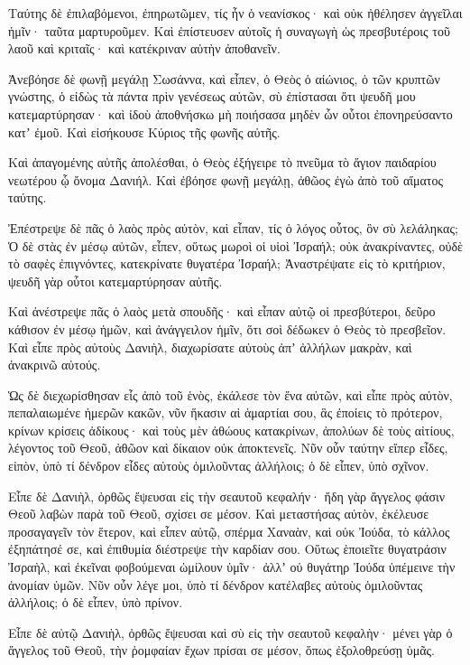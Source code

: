 {Ταύτης δὲ ἐπιλαβόμενοι, ἐπηρωτῶμεν, τίς ἦν ὁ νεανίσκος· καὶ οὐκ ἠθέλησεν ἀγγεῖλαι ἡμῖν· ταῦτα μαρτυροῦμεν.
Καὶ ἐπίστευσεν αὐτοῖς ἡ συναγωγὴ ὡς πρεσβυτέροις τοῦ λαοῦ καὶ κριταῖς· καὶ κατέκριναν αὐτὴν ἀποθανεῖν.
\par }{\PP {}Ἀνεβόησε δὲ φωνῇ μεγάλῃ Σωσάννα, καὶ εἶπεν, ὁ Θεὸς ὁ αἰώνιος, ὁ τῶν κρυπτῶν γνώστης, ὁ εἰδὼς τὰ πάντα πρὶν γενέσεως αὐτῶν,
σὺ ἐπίστασαι ὅτι ψευδῆ μου κατεμαρτύρησαν· καὶ ἰδοὺ ἀποθνήσκω μὴ ποιήσασα μηδὲν ὧν οὗτοι ἐπονηρεύσαντο κατʼ ἐμοῦ.
Καὶ εἰσήκουσε Κύριος τῆς φωνῆς αὐτῆς.
\par }{\PP {}Καὶ ἀπαγομένης αὐτῆς ἀπολέσθαι, ὁ Θεὸς ἐξήγειρε τὸ πνεῦμα τὸ ἅγιον παιδαρίου νεωτέρου ᾧ ὄνομα Δανιήλ.
Καὶ ἐβόησε φωνῇ μεγάλῃ, ἀθῶος ἐγὼ ἀπὸ τοῦ αἵματος ταύτης.
\par }{\PP {}Ἐπέστρεψε δὲ πᾶς ὁ λαὸς πρὸς αὐτὸν, καὶ εἶπαν, τίς ὁ λόγος οὗτος, ὃν σὺ λελάληκας;
Ὁ δὲ στὰς ἐν μέσῳ αὐτῶν, εἶπεν, οὕτως μωροὶ οἱ υἱοὶ Ἰσραήλ; οὐκ ἀνακρίναντες, οὐδὲ τὸ σαφὲς ἐπιγνόντες, κατεκρίνατε θυγατέρα Ἰσραήλ;
Ἀναστρέψατε εἰς τὸ κριτήριον, ψευδῆ γὰρ οὗτοι κατεμαρτύρησαν αὐτῆς.
\par }{\PP {}Καὶ ἀνέστρεψε πᾶς ὁ λαὸς μετὰ σπουδῆς· καὶ εἶπαν αὐτῷ οἱ πρεσβύτεροι, δεῦρο κάθισον ἐν μέσῳ ἡμῶν, καὶ ἀνάγγειλον ἡμῖν, ὅτι σοὶ δέδωκεν ὁ Θεὸς τὸ πρεσβεῖον.
Καὶ εἶπε πρὸς αὐτοὺς Δανιὴλ, διαχωρίσατε αὐτοὺς ἀπʼ ἀλλήλων μακρὰν, καὶ ἀνακρινῶ αὐτούς.
\par }{\PP {}Ὡς δὲ διεχωρίσθησαν εἷς ἀπὸ τοῦ ἑνὸς, ἐκάλεσε τὸν ἕνα αὐτῶν, καὶ εἶπε πρὸς αὐτὸν, πεπαλαιωμένε ἡμερῶν κακῶν, νῦν ἥκασιν αἱ ἁμαρτίαι σου, ἃς ἐποίεις τὸ πρότερον,
κρίνων κρίσεις ἀδίκους· καὶ τοὺς μὲν ἀθώους κατακρίνων, ἀπολύων δὲ τοὺς αἰτίους, λέγοντος τοῦ Θεοῦ, ἀθῶον καὶ δίκαιον οὐκ ἀποκτενεῖς.
Νῦν οὖν ταύτην εἴπερ εἶδες, εἰπὸν, ὑπὸ τί δένδρον εἶδες αὐτοὺς ὁμιλοῦντας ἀλλήλοις; ὁ δὲ εἶπεν, ὑπὸ σχῖνον.
\par }{\PP {}Εἶπε δὲ Δανιὴλ, ὀρθῶς ἔψευσαι εἰς τὴν σεαυτοῦ κεφαλήν· ἤδη γὰρ ἄγγελος φάσιν Θεοῦ λαβὼν παρὰ τοῦ Θεοῦ, σχίσει σε μέσον.
Καὶ μεταστήσας αὐτὸν, ἐκέλευσε προσαγαγεῖν τὸν ἕτερον, καὶ εἶπεν αὐτῷ, σπέρμα Χαναὰν, καὶ οὐκ Ἰούδα, τὸ κάλλος ἐξηπάτησέ σε, καὶ ἐπιθυμία διέστρεψε τὴν καρδίαν σου.
Οὕτως ἑποιεῖτε θυγατράσιν Ἰσραὴλ, καὶ ἐκεῖναι φοβούμεναι ὡμίλουν ὑμῖν· ἀλλʼ οὐ θυγάτηρ Ἰούδα ὑπέμεινε τὴν ἀνομίαν ὑμῶν.
Νῦν οὖν λέγε μοι, ὑπὸ τί δένδρον κατέλαβες αὐτοὺς ὁμιλοῦντας ἀλλήλοις; ὁ δὲ εἶπεν, ὑπὸ πρίνον.
\par }{\PP {}Εἶπε δὲ αὐτῷ Δανιὴλ, ὀρθῶς ἔψευσαι καὶ σὺ εἰς τὴν σεαυτοῦ κεφαλὴν· μένει γὰρ ὁ ἄγγελος τοῦ Θεοῦ, τὴν ῥομφαίαν ἔχων πρίσαι σε μέσον, ὅπως ἐξολοθρεύσῃ ὑμᾶς.
}
